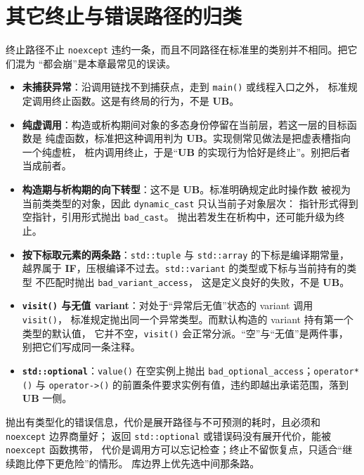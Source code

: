 \documentclass[12pt,a4paper,fontset=fandol]{ctexbook}
\newcommand{\Fn}[1]{\texttt{#1()}}
\newcommand{\Tp}[1]{\texttt{#1}}
\newcommand{\Bk}{\discretionary{}{}{}}
\newcommand{\UB}{\textbf{\textsf{UB}}}
\newcommand{\ILLF}{\textbf{\textsf{IF}}}
\begin{document}
\section{其它终止与错误路径的归类}\label{sec:ub11-other-paths}

终止路径不止 \Tp{noexcept} 违约一条，而且不同路径在标准里的类别并不相同。把它们混为
“都会崩”是本章最常见的误读。

\begin{itemize}
  \item \textbf{未捕获异常}：沿调用链找不到捕获点，走到 \Fn{main} 或线程入口之外，
        标准规定调用终止函数。这是有终局的行为，不是 \UB{}。
  \item \textbf{纯虚调用}：构造或析构期间对象的多态身份停留在当前层，若这一层的目标函数是
        纯虚函数，标准把这种调用判为 \UB{}。实现侧常见做法是把虚表槽指向一个纯虚桩，
        桩内调用终止，于是“\UB{} 的实现行为恰好是终止”。别把后者当成前者。
  \item \textbf{构造期与析构期的向下转型}：这不是 \UB{}。标准明确规定此时操作数
        被视为当前类类型的对象，因此 \Tp{dynamic{\Bk}\_cast} 只认当前子对象层次：
        指针形式得到空指针，引用形式抛出 \Tp{bad{\Bk}\_cast}。
        抛出若发生在析构中，还可能升级为终止。
  \item \textbf{按下标取元素的两条路}：\Tp{std::tuple} 与 \Tp{std::array} 的下标是编译期常量，
        越界属于 \ILLF{}，压根编译不过去。\Tp{std::variant} 的类型或下标与当前持有的类型
        不匹配时抛出 \Tp{bad{\Bk}\_variant{\Bk}\_access}，
        这是定义良好的失败，不是 \UB{}。
  \item \textbf{\Fn{visit} 与无值 variant}：对处于“异常后无值”状态的 variant 调用 \Fn{visit}，
        标准规定抛出同一个异常类型。而默认构造的 variant 持有第一个类型的默认值，
        它并不空，\Fn{visit} 会正常分派。“空”与“无值”是两件事，
        别把它们写成同一条注释。
  \item \textbf{\Tp{std::optional}}：\Tp{value()} 在空实例上抛出
        \Tp{bad{\Bk}\_optional{\Bk}\_access}；\Fn{operator*} 与 \Fn{operator->}
        的前置条件要求实例有值，违约即越出承诺范围，落到 \UB{} 一侧。
\end{itemize}

\begin{compare}[title={抛出、返回错误与终止的取舍}]
抛出有类型化的错误信息，代价是展开路径与不可预测的耗时，且必须和 \Tp{noexcept} 边界商量好；
返回 \Tp{std::optional} 或错误码没有展开代价，能被 \Tp{noexcept} 函数携带，
代价是调用方可以忘记检查；终止不留恢复点，只适合“继续跑比停下更危险”的情形。
库边界上优先选中间那条路。
\end{compare}
\end{document}
